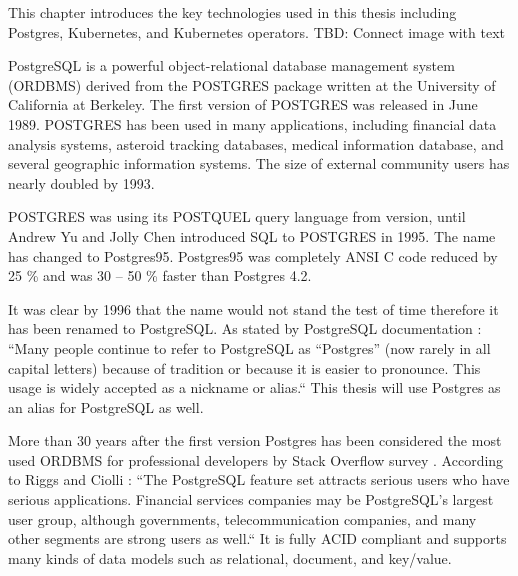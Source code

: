 \sloppy
{}
This chapter introduces the key technologies used in this thesis including Postgres, Kubernetes, and Kubernetes operators.
TBD: Connect image with text

PostgreSQL is a powerful object-relational database management system (ORDBMS) derived from the POSTGRES package written at the University of California at Berkeley. \cite{docuPgwhatIsPg} \cite{pg14introduction} The first version of POSTGRES was released in June 1989. POSTGRES has been used in many applications, including financial data analysis systems, asteroid tracking databases, medical information database, and several geographic information systems. The size of external community users has nearly doubled by 1993. \cite{docuPgBriefHistory}

POSTGRES was using its POSTQUEL query language from version, until Andrew Yu and Jolly Chen introduced SQL to POSTGRES in 1995. The name has changed to Postgres95. Postgres95 was completely ANSI C code reduced by 25 \% and was 30 – 50 \% faster than Postgres 4.2.  \cite{docuPgBriefHistory}

It was clear by 1996 that the name would not stand the test of time therefore it has been renamed to PostgreSQL. As stated by PostgreSQL documentation \cite{docuPgBriefHistory}: “Many people continue to refer to PostgreSQL as “Postgres” (now rarely in all capital letters) because of tradition or because it is easier to pronounce. This usage is widely accepted as a nickname or alias.“ This thesis will use Postgres as an alias for PostgreSQL as well.

More than 30 years after the first version Postgres has been considered the most used ORDBMS for professional developers by Stack Overflow survey \cite{so2022survey}. According to Riggs and Ciolli \cite{pg14introduction}: “The PostgreSQL feature set attracts serious users who have serious applications. Financial services companies may be PostgreSQL's largest user group, although governments, telecommunication companies, and many other segments are strong users as well.“ It is fully ACID compliant \cite{juba2015learningTransactionIsolation} and supports many kinds of data models such as relational, document, and key/value. \cite{pg14introduction}



